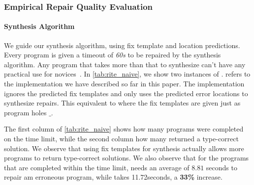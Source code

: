 

\subsubsection{Empirical Repair Quality Evaluation}
\label{subsec:eval:man_rep_qual_eval}

\paragraph{Synthesis Algorithm}
We guide our synthesis algorithm, using fix template and location predictions.
Every program is given a timeout of \emph{60s} to be repaired by the synthesis
algorithm. Any program that takes more than that to synthesize can't have any
practical use for novices~\cite{FIXME}. In \autoref{tab:rite_naive}, we show two
instances of \toolname. \toolname refers to the implementation we have described
so far in this paper. The \naive implementation ignores the predicted fix
templates and only uses the predicted error locations to synthesize repairs.
This equivalent to \toolname where the fix templates are given just as program
holes $\_$.

The first column of \autoref{tab:rite_naive} shows how many programs were
completed on the time limit, while the second column how many returned a
type-correct solution. We observe that using fix templates for synthesis
actually allows more programs to return type-correct solutions. We also observe
that for the programs that are completed within the time limit, \toolname needs
an average of $8.81$ seconds to repair am erroneous program, while \naive takes
11.72seconds, a \textbf{33\%} increase.

